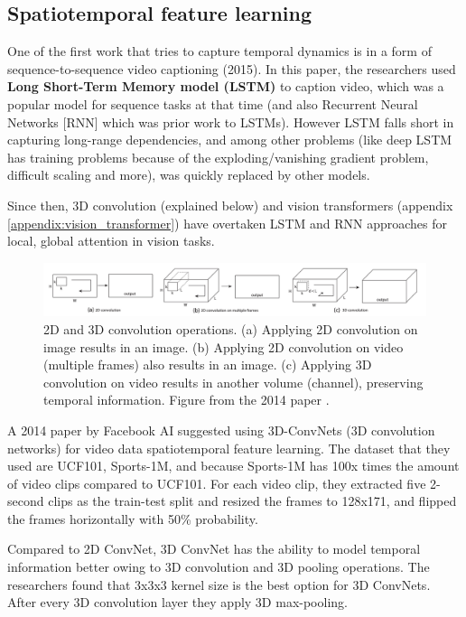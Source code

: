 \subsection{Spatiotemporal feature learning}

One of the first work that tries to capture temporal dynamics is in a form of sequence-to-sequence video captioning \cite{venugopalan2015sequence} (2015). In this paper, the researchers used \textbf{Long Short-Term Memory model (LSTM)} to caption video, which was a popular model for sequence tasks at that time (and also Recurrent Neural Networks [RNN] which was prior work to LSTMs). However LSTM falls short in capturing long-range dependencies, and among other problems (like deep LSTM has training problems because of the exploding/vanishing gradient problem, difficult scaling and more), was quickly replaced by other models.

Since then, 3D convolution (explained below) and vision transformers (appendix \ref{appendix:vision_transformer}) have overtaken LSTM and RNN approaches for local, global attention in vision tasks.

\begin{figure}
    \centering
    \includegraphics[width=1\textwidth]{images/video_synthesis/conv.png}
    \caption{2D and 3D convolution operations. (a) Applying 2D convolution on image results in an image. (b) Applying 2D convolution on video (multiple frames) also results in an image. (c) Applying 3D convolution on video results in another volume (channel), preserving temporal information. Figure from the 2014 paper \cite{tran2015learning}.}
\end{figure}

A 2014 paper \cite{tran2015learning} by Facebook AI suggested using 3D-ConvNets (3D convolution networks) for video data spatiotemporal feature learning. The dataset that they used are UCF101, Sports-1M, and because Sports-1M has 100x times the amount of video clips compared to UCF101. For each video clip, they extracted five 2-second clips as the train-test split and resized the frames to 128x171, and flipped the frames horizontally with 50\% probability.

Compared to 2D ConvNet, 3D ConvNet has the ability to model temporal information better owing to 3D convolution and 3D pooling operations. The researchers found that 3x3x3 kernel size is the best option for 3D ConvNets. After every 3D convolution layer they apply 3D max-pooling.

